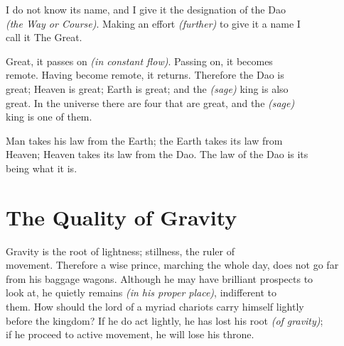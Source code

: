     I do not know its name, and I give it the designation of the Dao\\
    \textit{(the Way or Course)}. Making an effort \textit{(further)} to give it a name I\\
    call it The Great.\vspace{\baselineskip}
    
    Great, it passes on \textit{(in constant flow)}. Passing on, it becomes\\
    remote. Having become remote, it returns. Therefore the Dao is\\
    great; Heaven is great; Earth is great; and the \textit{(sage)} king is also\\
    great. In the universe there are four that are great, and the \textit{(sage)}\\
    king is one of them.\vspace{\baselineskip}
    
    Man takes his law from the Earth; the Earth takes its law from\\
    Heaven; Heaven takes its law from the Dao. The law of the Dao is its\\
    being what it is.\vspace{\baselineskip}
    
\section*{The Quality of Gravity}
    Gravity is the root of lightness; stillness, the ruler of\\
    movement.\vspace{\baselineskip}
    \newpage{}
    Therefore a wise prince, marching the whole day, does not go far\\
    from his baggage wagons. Although he may have brilliant prospects to\\
    look at, he quietly remains \textit{(in his proper place)}, indifferent to\\
    them. How should the lord of a myriad chariots carry himself lightly\\
    before the kingdom? If he do act lightly, he has lost his root \textit{(of gravity)};\\ if he proceed to active movement, he will lose his throne.\vspace{\baselineskip}
    
